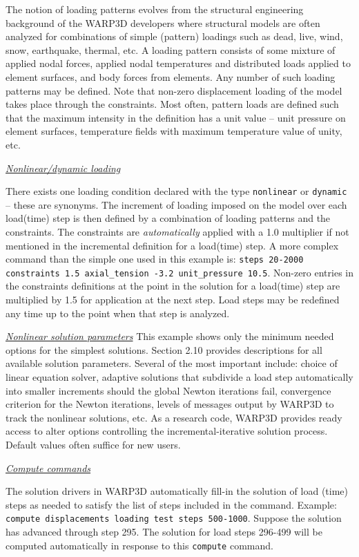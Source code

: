 \documentclass[11pt]{report}
\numberwithin{equation}{section}
\newcommand{\ttt} {\texttt}  %
\newcommand{\ul} {\underline}
\newcommand{\ti}{\emph}
\newcommand{\nid}{\noindent}
\begin{document}
{\nid The notion of loading patterns evolves from the structural engineering background of the WARP3D
developers where structural models are often analyzed for combinations of simple (pattern) loadings
such as dead, live, wind, snow, earthquake, thermal, etc.  A loading pattern consists of some
mixture of applied nodal forces, applied nodal temperatures and distributed loads applied to element
surfaces, and body forces from elements. Any number of such loading patterns may be defined. Note that
non-zero displacement loading of the model takes place through the constraints. Most often, pattern loads
are defined such that the maximum intensity in the definition has a unit value -- unit pressure on element surfaces,
temperature fields with maximum temperature value of unity, etc.

\nid \ti{\ul{Nonlinear/dynamic loading} }

\nid There exists one loading condition declared with the type \ttt{nonlinear} or \ttt{dynamic} -- these are synonyms.
The increment of loading imposed on the model over each load(time) step is then defined by a combination of
loading patterns and the constraints. The constraints are \ti{automatically} applied with a 1.0 multiplier
if not mentioned in the incremental definition for a load(time) step.  A more complex command than the simple one
used in this example is: \ttt{steps 20-2000 constraints 1.5 axial\_tension -3.2 unit\_pressure 10.5}. Non-zero 
entries in the constraints 
definitions at the point in the solution for a load(time) step are multiplied by 1.5 for application at the next
step. Load steps may be redefined any time up to the point when that step is analyzed.

\nid \ti{\ul{Nonlinear solution parameters} }
This example shows only the minimum needed options for the simplest solutions. Section 2.10 provides 
descriptions for all available solution parameters. Several of the most important include: choice of 
linear equation solver, adaptive solutions that subdivide a load step automatically into smaller increments
should the global Newton iterations fail, convergence criterion for the Newton iterations, levels of messages
output by WARP3D to track the nonlinear solutions, etc. As a research code, WARP3D provides ready access to
alter options controlling the incremental-iterative solution process. Default values often suffice
for new users.

\nid \ti{\ul{Compute commands} }

\nid The solution drivers in WARP3D automatically fill-in the solution of load (time)
steps as needed to satisfy the list of steps included in the command. Example: \ttt{compute displacements
loading test steps 500-1000}. Suppose the solution has advanced through step 295. The solution
for load steps 296-499 will be computed automatically in response to this \ttt{compute} 
command.

}
\end{document}
